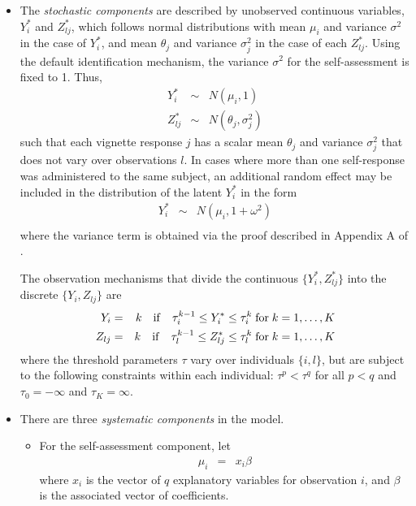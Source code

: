 \begin{itemize}
\item The \emph{stochastic components} are described by unobserved continuous
  variables, $Y_i^*$ and $Z_{lj}^*$, which follows normal
  distributions with mean $\mu_i$ and variance $\sigma^2$ in
  the case of $Y_i^*$, and mean $\theta_j$ and variance
  $\sigma_j^2$ in the case of each $Z_{lj}^*$.  Using the default
identification mechanism, the variance $\sigma^2$ for the
self-assessment is fixed to 1.  Thus, 
\begin{eqnarray*}
 Y_i^* & \sim & N(\mu_i, 1)\\
 Z_{lj}^* & \sim& N(\theta_j, \sigma_j^2)
\end{eqnarray*}
such that each vignette response $j$ has a scalar mean $\theta_j$ and
variance $\sigma_j^2$ that does not vary over observations
$l$.  In cases where more than one self-response was administered to the same subject, an additional random effect may be included in
the distribution of the latent $Y_i^*$ in the form
\begin{eqnarray*}
 Y_i^* & \sim & N(\mu_i, 1 + \omega^2)\\
\end{eqnarray*}
where the variance term is obtained via the proof described in
Appendix A of \cite{KinMurSal04}.

The observation mechanisms that divide the continuous $\{ Y_i^*,
Z_{lj}^* \}$ into the discrete $\{ Y_i, Z_{lj} \}$ are
\begin{eqnarray*}
 Y_i & = & k \quad {\rm if} \quad \tau_{i}^{k-1} \le Y_i^* \le \tau_{i}^{k}
    \; {\rm for} \; k = 1,\dots, K \\
 Z_{lj} & = & k \quad {\rm if} \quad \tau_{l}^{k-1} \le Z_{lj}^* \le \tau_{l}^{k}
    \; {\rm for} \; k = 1,\dots, K 
\end{eqnarray*}
where the threshold parameters $\tau$ vary over individuals $\{i, l
\}$, but are subject to the following constraints within each
individual: $\tau^p < \tau^q$ for all $p < q$ and $\tau_0=-\infty$ and
$\tau_K=\infty$.

\item There are three \emph{systematic components} in the model.  
\begin{itemize}

\item For the self-assessment component, let
\begin{eqnarray*}
\mu_i &=& x_i \beta 
\end{eqnarray*}
where $x_i$ is the vector of $q$ explanatory variables for observation $i$,
and $\beta$ is the associated vector of coefficients.


\end{itemize}
\end{itemize}
